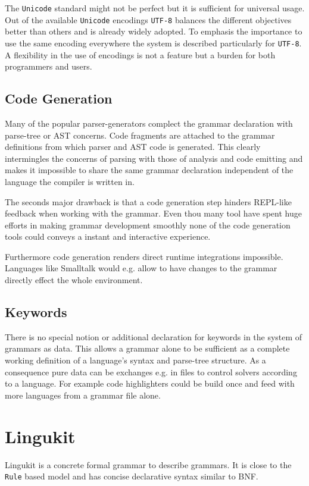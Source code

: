 \documentclass[10pt,a4paper]{article}
\begin{document}
The \texttt{Unicode} standard might not be perfect but it is sufficient for universal usage. Out of the available \texttt{Unicode} encodings \texttt{UTF-8} balances the different objectives better than others and is already widely adopted. To emphasis the importance to use the same encoding everywhere the system is described particularly for \texttt{UTF-8}. A flexibility in the use of encodings is not a feature but a burden for both programmers and users.

\subsection{Code Generation}
Many of the popular parser-generators complect the grammar declaration with parse-tree or AST concerns. Code fragments are attached to the grammar definitions from which parser and AST code is generated. This clearly intermingles the concerns of parsing with those of analysis and code emitting and makes it impossible to share the same grammar declaration independent of the language the compiler is written in. 

The seconds major drawback is that a code generation step hinders  REPL-like feedback when working with the grammar. Even thou many tool have spent huge efforts in making grammar development smoothly none of the code generation tools could conveys a instant and interactive experience. 

Furthermore code generation renders direct runtime integrations impossible. Languages like Smalltalk would e.g. allow to have changes to the grammar directly effect the whole environment.

\subsection{Keywords}
There is no special notion or additional declaration for keywords in the system of grammars as data. This allows a grammar alone to be sufficient as a complete working definition of a language's syntax and parse-tree structure. As a consequence pure data can be exchanges e.g. in files to control solvers according to a language. For example code highlighters could be build once and feed with more languages from a grammar file alone.

\section{Lingukit}
Lingukit is a concrete formal grammar to describe grammars. It is close to the \texttt{Rule} based model and has concise declarative syntax similar to BNF.

\newpage

\end{document}
